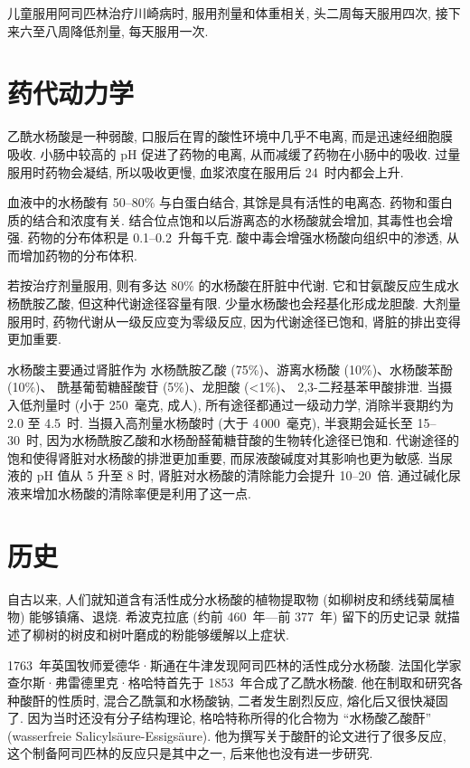 儿童服用阿司匹林治疗川崎病时, 服用剂量和体重相关,
头二周每天服用四次, 接下来六至八周降低剂量, 每天服用一次.

\section{药代动力学}

乙酰水杨酸是一种弱酸,
口服后在胃的酸性环境中几乎不电离,
而是迅速经细胞膜吸收.
小肠中较高的 pH 促进了药物的电离,
从而减缓了药物在小肠中的吸收.
过量服用时药物会凝结, 所以吸收更慢,
血浆浓度在服用后 24~时内都会上升.

血液中的水杨酸有 50--80\% 与白蛋白结合,
其馀是具有活性的电离态.
药物和蛋白质的结合和浓度有关.
结合位点饱和以后游离态的水杨酸就会增加, 其毒性也会增强.
药物的分布体积是 0.1--0.2~升每千克.
酸中毒会增强水杨酸向组织中的渗透, 从而增加药物的分布体积.

若按治疗剂量服用, 则有多达 80\% 的水杨酸在肝脏中代谢.
它和甘氨酸反应生成水杨酰胺乙酸, 但这种代谢途径容量有限.
少量水杨酸也会羟基化形成龙胆酸.
大剂量服用时, 药物代谢从一级反应变为零级反应,
因为代谢途径已饱和, 肾脏的排出变得更加重要.

水杨酸主要通过肾脏作为%
水杨酰胺乙酸 (75\%)、游离水杨酸 (10\%)、水杨酸苯酚 (10\%)、%
酰基葡萄糖醛酸苷 (5\%)、龙胆酸 (<1\%)、 2,3-二羟基苯甲酸排泄.
当摄入低剂量时 (小于 250~毫克, 成人),
所有途径都通过一级动力学, 消除半衰期约为 2.0 至 4.5~时.
当摄入高剂量水杨酸时 (大于 4\,000~毫克),
半衰期会延长至 15--30~时,
因为水杨酰胺乙酸和水杨酚醛葡糖苷酸的生物转化途径已饱和.
代谢途径的饱和使得肾脏对水杨酸的排泄更加重要,
而尿液酸碱度对其影响也更为敏感.
当尿液的 pH 值从 5 升至 8 时,
肾脏对水杨酸的清除能力会提升 10--20~倍.
通过碱化尿液来增加水杨酸的清除率便是利用了这一点.

\section{历史}

自古以来, 人们就知道含有活性成分水杨酸的植物提取物
(如柳树皮和绣线菊属植物) 能够镇痛、退烧.
希波克拉底 (约前 460~年—前 377~年) 留下的历史记录%
就描述了柳树的树皮和树叶磨成的粉能够缓解以上症状.

1763~年英国牧师爱德华·斯通在牛津发现阿司匹林的活性成分水杨酸.
法国化学家查尔斯·弗雷德里克·格哈特首先于 1853~年合成了乙酰水杨酸.
他在制取和研究各种酸酐的性质时, 混合乙酰氯和水杨酸钠,
二者发生剧烈反应, 熔化后又很快凝固了.
因为当时还没有分子结构理论, 格哈特称所得的化合物为
``水杨酸乙酸酐''
(wasserfreie Salicyls\"aure-Essigs\"aure).
他为撰写关于酸酐的论文进行了很多反应,
这个制备阿司匹林的反应只是其中之一, 后来他也没有进一步研究.

